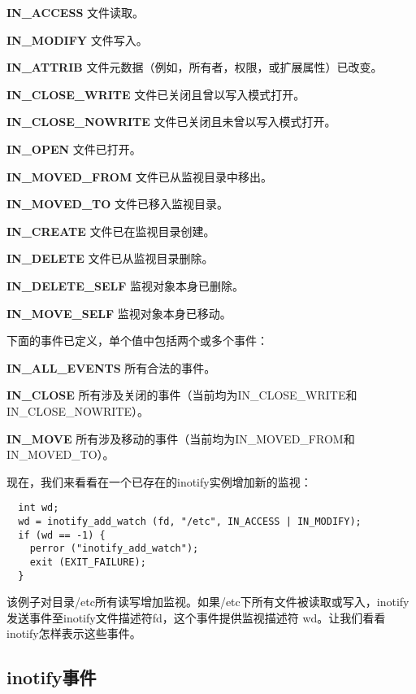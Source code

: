 \begin{eqlist*}
\item[\textbf{IN\_ACCESS}] 文件读取。
\item[\textbf{IN\_MODIFY}] 文件写入。
\item[\textbf{IN\_ATTRIB}] 文件元数据（例如，所有者，权限，或扩展属性）已改变。
\item[\textbf{IN\_CLOSE\_WRITE}] 文件已关闭且曾以写入模式打开。
\item[\textbf{IN\_CLOSE\_NOWRITE}] 文件已关闭且未曾以写入模式打开。
\item[\textbf{IN\_OPEN}] 文件已打开。
\item[\textbf{IN\_MOVED\_FROM}] 文件已从监视目录中移出。
\item[\textbf{IN\_MOVED\_TO}] 文件已移入监视目录。
\item[\textbf{IN\_CREATE}] 文件已在监视目录创建。
\item[\textbf{IN\_DELETE}] 文件已从监视目录删除。
\item[\textbf{IN\_DELETE\_SELF}] 监视对象本身已删除。
\item[\textbf{IN\_MOVE\_SELF}] 监视对象本身已移动。
\end{eqlist*}

下面的事件已定义，单个值中包括两个或多个事件：

\begin{eqlist*}
\item[\textbf{IN\_ALL\_EVENTS}] 所有合法的事件。
\item[\textbf{IN\_CLOSE}] 所有涉及关闭的事件（当前均为IN\_CLOSE\_WRITE和IN\_CLOSE\_NOWRITE）。
\item[\textbf{IN\_MOVE}] 所有涉及移动的事件（当前均为IN\_MOVED\_FROM和IN\_MOVED\_TO）。
\end{eqlist*}

现在，我们来看看在一个已存在的inotify实例增加新的监视：

\begin{lstlisting}
  int wd;
  wd = inotify_add_watch (fd, "/etc", IN_ACCESS | IN_MODIFY);
  if (wd == -1) {
    perror ("inotify_add_watch");
    exit (EXIT_FAILURE);
  }
\end{lstlisting}

该例子对目录/etc所有读写增加监视。如果/etc下所有文件被读取或写入，inotify发送事件至inotify文件描述符fd，这个事件提供监视描述符 wd。让我们看看inotify怎样表示这些事件。

\subsection{inotify事件}

